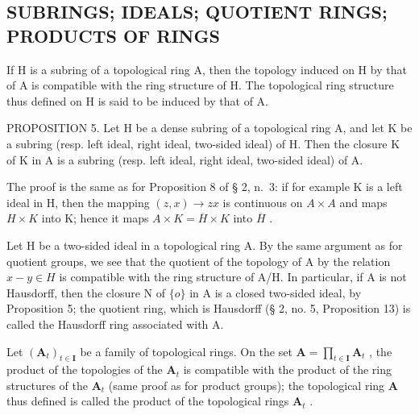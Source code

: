 \subsection{SUBRINGS; IDEALS; QUOTIENT RINGS; PRODUCTS OF RINGS}

If H is a subring of a topological ring A, then the topology induced on H by that of A is compatible with the ring structure of H. The topological ring structure thus defined on H is said to be induced by that of A.

PROPOSITION 5. Let H be a dense subring of a topological ring A, and let K be a subring (resp. left ideal, right ideal, two-sided ideal) of H. Then the closure K of K in A is a subring (resp. left ideal, right ideal, two-sided ideal) of A.

The proof is the same as for Proposition 8 of § 2, n.~3: if for example K is a left ideal in H, then the mapping \((z, x) \to zx\) is continuous on \(A \times A\) and maps \(H \times K\) into K; hence it maps \(A \times K = \overline{H} \times K\) into \(\overline{H}\) .

Let H be a two-sided ideal in a topological ring A. By the same argument as for quotient groups, we see that the quotient of the topology of A by the relation \(x - y \in H\) is compatible with the ring structure of A/H. In particular, if A is not Hausdorff, then the closure N of \(\{o\}\) in A is a closed two-sided ideal, by Proposition 5; the quotient ring, which is Hausdorff (§ 2, no. 5, Proposition 13) is called the Hausdorff ring associated with A.

Let \((\mathbf{A}_t)_{t\in \mathbf{I}}\) be a family of topological rings. On the set \(\mathbf{A} = \prod_{t\in \mathbf{I}}\mathbf{A}_t\) , the product of the topologies of the \(\mathbf{A}_t\) is compatible with the product of the ring structures of the \(\mathbf{A}_t\) (same proof as for product groups); the topological ring \(\mathbf{A}\) thus defined is called the product of the topological rings \(\mathbf{A}_t\) .

